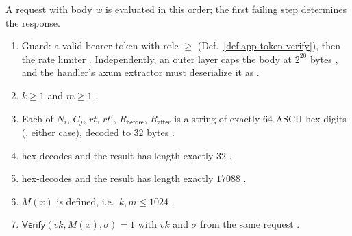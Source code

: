 \begin{definition}
\label{def:app-admit-http}
A  request with body $w$ is evaluated in this order;
the first failing step determines the response.
\begin{enumerate}
  \item[(W0)] Guard: a valid bearer token with role $\ge$ 
        (Def.~\ref{def:app-token-verify}), then the rate limiter
         .
        Independently, an outer layer caps the body at $2^{20}$ bytes
        , and the handler's axum
         extractor must deserialize it as 
        .
  \item[(W1)] $k\ge 1$ and $m\ge 1$ .
  \item[(W2)] Each of $N_i$, $C_j$, $rt$, $rt'$, $R_{\mathsf{before}}$,
        $R_{\mathsf{after}}$ is a string of exactly 64 ASCII hex digits
        (, either case), decoded to 32 bytes
        .
  \item[(W3)]  hex-decodes and the result has length
        exactly $32$ .
  \item[(W4)]  hex-decodes and the result has length exactly
        $17088$ .
  \item[(W5)] $M(x)$ is defined, i.e.\ $k,m\le 1024$
        .
  \item[(W6)] $\mathsf{Verify}(vk, M(x), \sigma)=1$ with $vk$ and $\sigma$ from
        the same request 
        .

\end{enumerate}
\end{definition}
